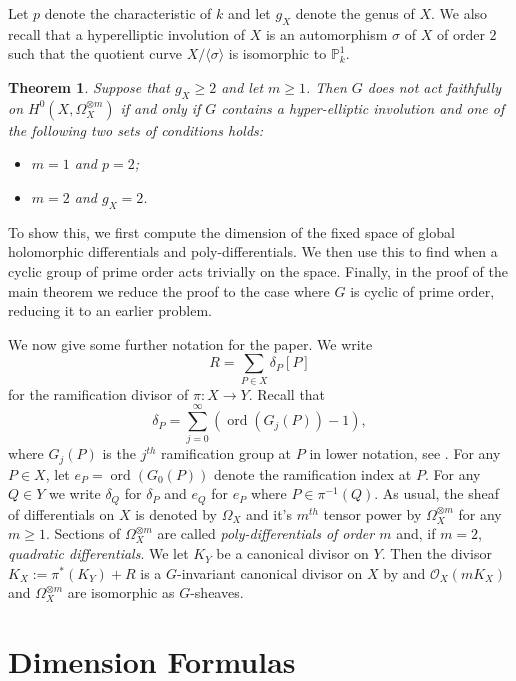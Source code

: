 \documentclass[11pt]{article} %
\newtheorem*{unnumthm}{Theorem}
\theoremstyle{remark}\newtheorem*{rem}{Remark}
\DeclareMathOperator{\ord}{ord}
\begin{document}
Let $p$ denote the characteristic of $k$ and let $g_X$ denote the genus of $X$.
We also recall that a hyperelliptic involution of $X$ is an automorphism $\sigma$ of $X$ of order $2$ such that the quotient curve $X/\langle \sigma \rangle$ is isomorphic to $\mathbb{P}_k^1$. \\
\newpage
  \begin{unnumthm}
    Suppose that $g_X\geq 2$ and let $m\geq1$. 
    Then $G$ does not act faithfully on $H^0(X,\Omega_X^{\otimes m})$ if and only if $G$ contains a hyper-elliptic involution and one of the following two sets of conditions holds:
      \begin{itemize}
	\item $m=1$ and $p=2$;
	\item $m=2$ and $g_X=2$.
      \end{itemize}
  \end{unnumthm}
To show this, we first compute the dimension of the fixed space of global holomorphic differentials and poly-differentials.
We then use this to find when a cyclic group of prime order acts trivially on the space.
Finally, in the proof of the main theorem we reduce the proof to the case where $G$ is cyclic of prime order, reducing it to an earlier problem.

We now give some further notation for the paper.
We write
  \[
      R=\sum_{P\in X}\delta_P[P]
  \]
for the ramification divisor of $\pi:X \rightarrow Y$.
Recall that
  \[
     \delta_P=\sum_{j=0}^{\infty}(\ord(G_j(P))-1),
  \]
where $G_j(P)$ is the $j^{th}$ ramification group at $P$ in lower notation, see \cite[Ch. IV, {\S}~1]{localfields}.
For any $P\in X$, let $e_P=\ord(G_0(P))$ denote the ramification index at $P$.
For any $Q\in Y$ we write $\delta_Q$ for $\delta_P$ and $e_Q$ for $e_P$ where $P\in \pi^{-1}(Q)$.
As usual, the sheaf of differentials on $X$ is denoted by $\Omega_X$ and it's $m^{th}$ tensor power by $\Omega_X^{\otimes m}$ for any $m\geq 1$.
Sections of $\Omega_X^{\otimes m}$ are called {\em poly-differentials of order $m$} and, if $m=2$, {\em quadratic differentials}.
We let $K_Y$ be a canonical divisor on $Y$. 
Then the divisor $K_X:=\pi^*(K_Y)+R$ is a $G$-invariant canonical divisor on $X$ by \cite[{\S} IV, Prop. 2.3]{hart} and $\mathscr{O}_X(mK_X)$ and $\Omega_X^{\otimes m}$ are isomorphic as $G$-sheaves.

  \section{Dimension Formulas}
\end{document}
